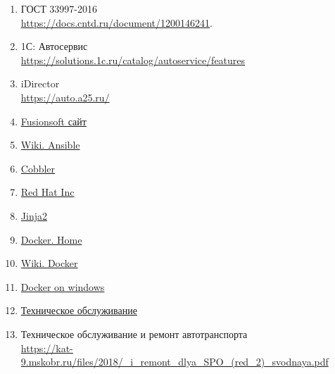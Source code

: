 \begin{enumerate}
	\item ГОСТ 33997-2016 \\
	\url{https://docs.cntd.ru/document/1200146241}.
		\label{ref:ГОСТ-требования-то}

	\item 1С: Автосервис\\
		\url{https://solutions.1c.ru/catalog/autoservice/features}
		\label{ref:1С-автосервис}

	\item iDirector\\
		\url{https://auto.a25.ru/}
		\label{ref:iDirector}

    \item \href{https://www.fusionsoft.ru}
        {Fusionsoft сайт}
		\label{ref:fs}

    \item \href{https://ru.wikipedia.org/wiki/Ansible}
        {Wiki. Ansible}
		\label{ref:wiki-ansible}

    \item \href{https://cobbler.github.io/}
        {Cobbler}
		\label{ref:cobbler}

    \item \href{https://www.redhat.com/en}
        {Red Hat Inc}
		\label{ref:redhat}

    \item \href{https://jinja.palletsprojects.com/en/3.1.x/}
        {Jinja2}
		\label{ref:jinja2}

    \item \href{https://www.docker.com/}
        {Docker. Home}
		\label{ref:docker}

    \item \href{https://ru.wikipedia.org/wiki/Docker}
        {Wiki. Docker}
		\label{ref:wiki-docker}

    \item \href{https://www.docker.com/blog/tp-docker-engine-windows-server-2016/}
        {Docker on windows}
		\label{ref:docker-windows}

	\item \href{http://абсолютпб.рф/техническое-обслуживание}{Техническое
		обслуживание}
		\label{ref:техническое-обслуживание}

	\item Техническое обслуживание и ремонт автотранспорта \\
		\url{https://kat-9.mskobr.ru/files/2018/_i_remont_dlya_SPO_(red_2)_svodnaya.pdf}
		\label{ref:му-ремонт-и-техническое-обслуживание}


\end{enumerate}
